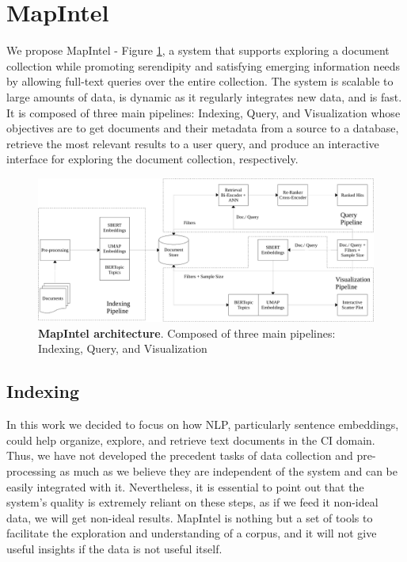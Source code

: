 \documentclass[a4paper]{article}
\begin{document}
\section{MapIntel}
We propose MapIntel - Figure \ref{system_architecture}, a system that supports exploring a document collection while promoting serendipity and satisfying emerging information needs by allowing full-text queries over the entire collection.
The system is scalable to large amounts of data, is dynamic as it regularly integrates new data, and is fast. It is composed of three main pipelines: Indexing, Query, and Visualization whose objectives are to get documents and their metadata from a source to a database, retrieve the most relevant results to a user query, and produce an interactive interface for exploring the document collection, respectively. 

\begin{figure}[H]
  \centering
  \includegraphics[scale=0.5]{./assets/system_architecture}
  \caption{\textbf{MapIntel architecture}. Composed of three main pipelines: Indexing, Query, and Visualization}
  \label{system_architecture}
\end{figure}

\subsection{Indexing} \label{indexing}
In this work we decided to focus on how NLP, particularly sentence embeddings, could help organize, explore, and retrieve text documents in the CI domain. Thus, we have not developed the precedent tasks of data collection and pre-processing as much as we believe they are independent of the system and can be easily integrated with it. Nevertheless, it is essential to point out that the system's quality is extremely reliant on these steps, as if we feed it non-ideal data, we will get non-ideal results. MapIntel is nothing but a set of tools to facilitate the exploration and understanding of a corpus, and it will not give useful insights if the data is not useful itself. 
\end{document}
